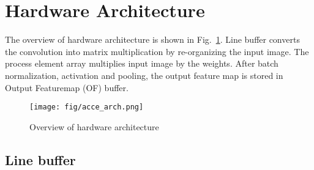 \documentclass[conference]{IEEEtran}
\begin{document}

\section{Hardware Architecture}\label{sec:Architecture}
The overview of hardware architecture is shown in Fig.~\ref{fig:acce_arch}. Line buffer converts the convolution into matrix multiplication by re-organizing the input image. The process element array multiplies input image by the weights. After batch normalization, activation and pooling, the output feature map is stored in Output Featuremap (OF) buffer.

\begin{figure}[htbp]
	\centering
	\texttt{[image: fig/acce\_arch.png]}
	\caption{Overview of hardware architecture}
	\label{fig:acce_arch}
\end{figure}

\subsection{Line buffer}
\begin{comment}
\textcolor{red}{
The input data stream from DMA is firstly buffered by stream FIFO. The padding controller decides sending the feature map element or 0 to line buffer.
}
\textcolor{red}{
It reforms the feature map into $3\times 1$ sliding window and then sends them into dual-port RAM. In order to diminish the time cost for feature map transmission, two clock domains are introduced and linked by the dual-port RAM (Fig.~\ref{fig:zero_pad}). Higher speed clock is assigned to input feature map filling side and lower speed clock is assigned to CNN processing side.
}
\end{comment}
\end{document}
